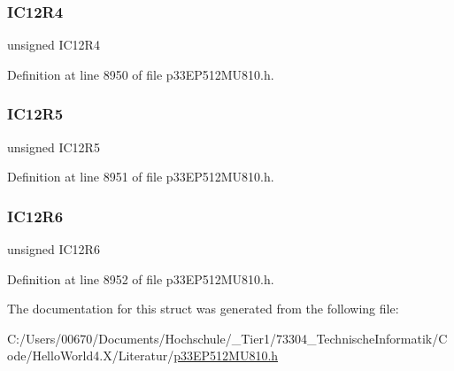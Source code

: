 \subsubsection{\texorpdfstring{I\+C12\+R4}{IC12R4}}
{\footnotesize\ttfamily unsigned I\+C12\+R4}



Definition at line 8950 of file p33\+E\+P512\+M\+U810.\+h.

\mbox{\label{structtag_r_p_i_n_r34_b_i_t_s_a01c138f27fb62c09dff3fc9399540b11}} 
\subsubsection{\texorpdfstring{I\+C12\+R5}{IC12R5}}
{\footnotesize\ttfamily unsigned I\+C12\+R5}



Definition at line 8951 of file p33\+E\+P512\+M\+U810.\+h.

\mbox{\label{structtag_r_p_i_n_r34_b_i_t_s_ae6957699daafd8ce92358db8106cc338}} 
\subsubsection{\texorpdfstring{I\+C12\+R6}{IC12R6}}
{\footnotesize\ttfamily unsigned I\+C12\+R6}



Definition at line 8952 of file p33\+E\+P512\+M\+U810.\+h.



The documentation for this struct was generated from the following file\+:\begin{DoxyCompactItemize}
\item 
C\+:/\+Users/00670/\+Documents/\+Hochschule/\+\_\+\+Tier1/73304\+\_\+\+Technische\+Informatik/\+Code/\+Hello\+World4.\+X/\+Literatur/\hyperlink{p33_e_p512_m_u810_8h}{p33\+E\+P512\+M\+U810.\+h}\end{DoxyCompactItemize}
